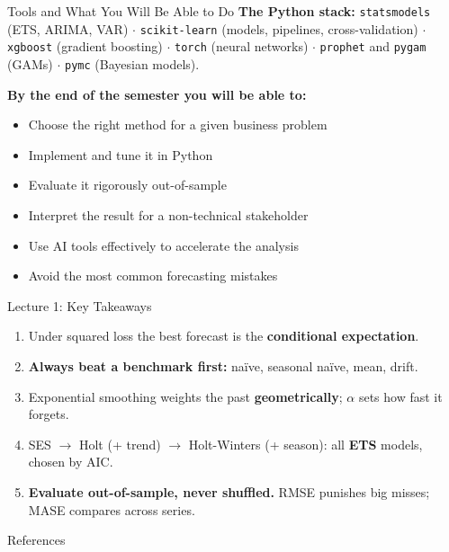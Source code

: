 \documentclass[aspectratio=169, 11pt]{beamer}
\begin{document}
\begin{frame}{Tools and What You Will Be Able to Do}
  \textbf{The Python stack:} \texttt{statsmodels} (ETS, ARIMA, VAR) $\cdot$
  \texttt{scikit-learn} (models, pipelines, cross-validation) $\cdot$
  \texttt{xgboost} (gradient boosting) $\cdot$ \texttt{torch} (neural networks)
  $\cdot$ \texttt{prophet} and \texttt{pygam} (GAMs) $\cdot$ \texttt{pymc}
  (Bayesian models).

  \vspace{0.25cm}
  \textbf{By the end of the semester you will be able to:}
  \begin{itemize}\itemsep2pt
    \item[\pos{$\checkmark$}] Choose the right method for a given business problem
    \item[\pos{$\checkmark$}] Implement and tune it in Python
    \item[\pos{$\checkmark$}] Evaluate it rigorously out-of-sample
    \item[\pos{$\checkmark$}] Interpret the result for a non-technical stakeholder
    \item[\pos{$\checkmark$}] Use AI tools effectively to accelerate the analysis
    \item[\pos{$\checkmark$}] Avoid the most common forecasting mistakes
  \end{itemize}
\end{frame}

\begin{frame}{Lecture 1: Key Takeaways}
  \begin{keybox}
    {\small
    \begin{enumerate}
      \item Under squared loss the best forecast is the
            \textbf{conditional expectation}.

      \item \textbf{Always beat a benchmark first:}
            na\"{i}ve, seasonal na\"{i}ve, mean, drift.

      \item Exponential smoothing weights the past \textbf{geometrically};
            $\alpha$ sets how fast it forgets.

      \item SES $\to$ Holt (+ trend) $\to$ Holt-Winters (+ season): all
            \textbf{ETS} models, chosen by AIC.

      \item \textbf{Evaluate out-of-sample, never shuffled.} RMSE punishes big
            misses; MASE compares across series.
    \end{enumerate}
    }
  \end{keybox}
\end{frame}

\begin{frame}[allowframebreaks]{References}
  \printbibliography[heading=none]
\end{frame}

\end{document}
